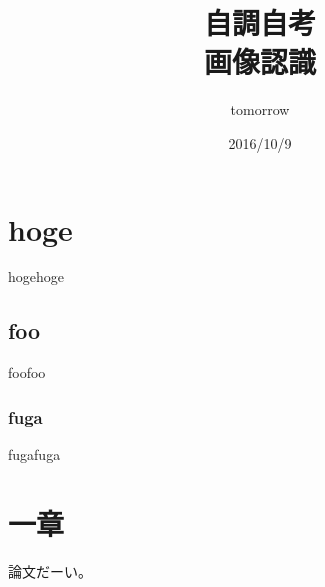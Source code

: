 \documentclass[11pt.a4j]{jarticle}
\title{自調自考 \\ 画像認識}
\author{tomorrow}
\date{2016/10/9}
\begin{document}
	\maketitle

	\tableofcontents

	\section{hoge}
	hogehoge
	\subsection{foo}
	foofoo
	\subsubsection{fuga}
	fugafuga

	\section{一章}
	論文だーい。
\end{document}
